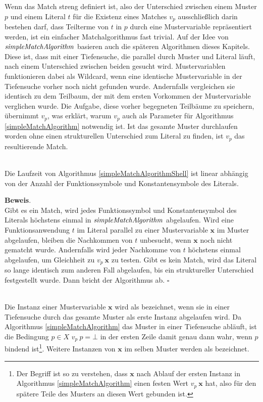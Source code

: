Wenn das Match streng definiert ist, also der Unterschied zwischen einem Muster $p$ und einem Literal $t$ für die Existenz eines Matches $v_p$ ausschließlich darin bestehen darf, dass Teilterme von $t$ in $p$ durch eine Mustervariable repräsentiert werden, ist ein einfacher Matchalgorithmus fast trivial. Auf der Idee von $\mathit{simpleMatchAlgorithm}$ basieren auch die späteren Algorithmen dieses Kapitels. Diese ist, dass mit einer Tiefensuche, die parallel durch Muster und Literal läuft, nach einem Unterschied zwischen beiden gesucht wird. Mustervariablen funktionieren dabei als Wildcard, wenn eine identische Mustervariable in der Tiefensuche vorher noch nicht gefunden wurde. Andernfalls vergleichen sie identisch zu dem Teilbaum, der mit dem ersten Vorkommen der Mustervariable verglichen wurde. Die Aufgabe, diese vorher begegneten Teilbäume zu speichern, übernimmt $v_p$, was erklärt, warum $v_p$ auch als Parameter für Algorithmus \ref{simpleMatchAlgorithm} notwendig ist. Ist das gesamte Muster durchlaufen worden ohne einen strukturellen Unterschied zum Literal zu finden, ist $v_p$ das resultierende Match.\\

\begin{lemma}~\\
Die Laufzeit von Algorithmus \ref{simpleMatchAlgorithmShell} ist linear abhängig von der Anzahl der Funktionssymbole und Konstantensymbole des Literals.
\end{lemma}

\textbf{Beweis}.\\
Gibt es ein Match, wird jedes Funktionssymbol und Konstantensymbol des Literals höchstens einmal in $\mathit{simpleMatchAlgorithm}$ abgelaufen. Wird eine Funktionsanwendung $t$ im Literal parallel zu einer Mustervariable $\mathbf x$ im Muster abgelaufen, bleiben die Nachkommen von $t$ unbesucht, wenn $\mathbf x$ noch nicht gematcht wurde. Andernfalls wird jeder Nachkomme von $t$ höchstens einmal abgelaufen, um Gleichheit zu $v_p~\mathbf x$ zu testen.
Gibt es kein Match, wird das Literal so lange identisch zum anderen Fall abgelaufen, bis ein struktureller Unterschied festgestellt wurde. Dann bricht der Algorithmus ab.
\hfill $\square$\\


\begin{definition}~\\
Die Instanz einer Mustervariable $\mathbf x$ wird als   bezeichnet, wenn sie in einer Tiefensuche durch das gesamte Muster als erste Instanz abgelaufen wird. Da Algorithmus \ref{simpleMatchAlgorithm} das Muster in einer Tiefensuche abläuft, ist die Bedingung $p \in X$ \KwAnd $v_p~p = \bot$ in der ersten Zeile damit genau dann wahr, wenn $p$ bindend ist\footnote{Der Begriff  ist so zu verstehen, dass $\mathbf x$ nach Ablauf der ersten Instanz in Algorithmus \ref{simpleMatchAlgorithm} einen festen Wert $v_p~\mathbf x$ hat, also für den spätere Teile des Musters an diesen Wert gebunden ist.}. Weitere Instanzen von $\mathbf x$ im selben Muster werden als  bezeichnet.
\end{definition}


